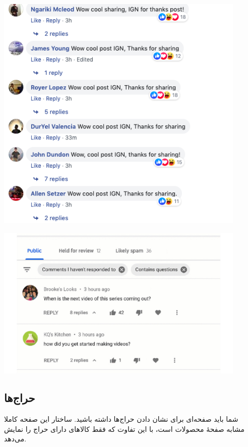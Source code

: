 \documentclass[]{article}
\begin{document}
\begin{center}
\includegraphics[width=0.9\textwidth]{images/image25.png}
\end{center}


\begin{center}
\includegraphics[width=0.9\textwidth]{images/image26.png}
\end{center}

\newpage

\subsection*{{\titr حراج‌ها}}

شما باید صفحه‌ای برای نشان دادن حراج‌ها داشته باشید. ساختار این صفحه کاملا مشابه صفحهٔ محصولات است، با این تفاوت که فقط کالاهای دارای حراج را نمایش می‌دهد.
\end{document}
